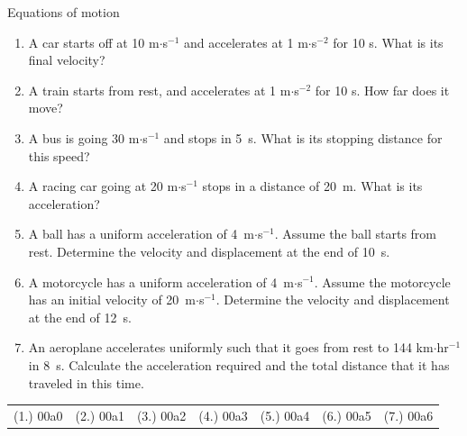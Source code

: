 \begin{exercises}{Equations of motion}
            \nopagebreak \noindent
          \label{m38796*id79517}\begin{enumerate}[noitemsep, label=\textbf{\arabic*}. ] 
\label{m38796*uid144}\item A car starts off at 10 m$\ensuremath{\cdot}$s${}^{-1}$ and accelerates at 1 m$\ensuremath{\cdot}$s${}^{-2}$ for 10 s. What is its final velocity?\newline
\label{m38796*uid145}\item A train starts from rest, and accelerates at 1 m$\ensuremath{\cdot}$s${}^{-2}$ for 10 s. How far does it move?\newline
\label{m38796*uid146}\item A bus is going 30 m$\ensuremath{\cdot}$s${}^{-1}$ and stops in 5~s. What is its stopping distance for this speed?\newline
\label{m38796*uid147}\item A racing car going at 20 m$\ensuremath{\cdot}$s${}^{-1}$ stops in a distance of 20~m. What is its acceleration?\newline
\label{m38796*uid148}\item A ball has a uniform acceleration of 4~m$\ensuremath{\cdot}$s${}^{-1}$. Assume the ball starts from rest. Determine the velocity and displacement at the end of 10~s.\newline
\label{m38796*uid149}\item A motorcycle has a uniform acceleration of 4~m$\ensuremath{\cdot}$s${}^{-1}$. Assume the motorcycle has an initial velocity of 20~m$\ensuremath{\cdot}$s${}^{-1}$. Determine the velocity and displacement at the end of 12~s.\newline
\label{m38796*uid150}\item An aeroplane accelerates uniformly such that it goes from rest to 144 km$\ensuremath{\cdot}$hr${}^{-1}$in 8~s. Calculate the acceleration required and the total distance that it has traveled in this time.\newline
\end{enumerate}
    \label{m38796*cid11}
\par \practiceinfo
 \par \begin{tabular}[h]{cccccc}
 (1.) 00a0  &  (2.) 00a1  &  (3.) 00a2  &  (4.) 00a3  &  (5.) 00a4  &  (6.) 00a5  & (7.) 00a6 \end{tabular}
\end{exercises}

